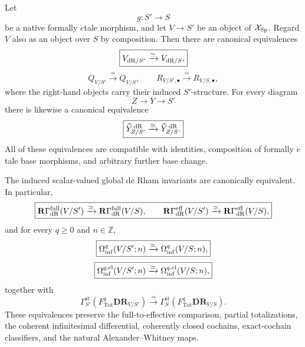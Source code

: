 \begin{theorem}
\label{thm:formal-etale-change-of-base-intrinsic}
Let
\[
    g:S'\longrightarrow S
\]
be a native formally \(\acute{e}\)tale morphism, and let \(V\to S'\) be an
object of \(\mathcal X_{\mathrm{Sp}}\).  Regard \(V\) also as an object over \(S\) by
composition.  Then there are canonical equivalences
\[
\boxed{
    V_{\mathrm{dR}/S'}
    \xrightarrow{\simeq}
    V_{\mathrm{dR}/S},
}
\]
\[
\boxed{
    Q_{V/S'}
    \xrightarrow{\simeq}
    Q_{V/S},
    \qquad
    R_{V/S',\bullet}
    \xrightarrow{\simeq}
    R_{V/S,\bullet},
}
\]
where the right-hand objects carry their induced \(S'\)-structure.  For every
diagram
\[
    Z\longrightarrow Y\longrightarrow S'
\]
there is likewise a canonical equivalence
\[
\boxed{
    \widehat Y^{\,\mathrm{dR}}_{Z/S'}
    \xrightarrow{\simeq}
    \widehat Y^{\,\mathrm{dR}}_{Z/S}.
}
\]
All of these equivalences are compatible with identities, composition of
formally \(\acute{e}\)tale base morphisms, and arbitrary further base change.

The induced scalar-valued global de Rham invariants are canonically
equivalent.  In particular,
\[
\boxed{
    \mathbf R\Gamma_{\mathrm{dR}}^{\mathrm{full}}(V/S')
    \xrightarrow{\simeq}
    \mathbf R\Gamma_{\mathrm{dR}}^{\mathrm{full}}(V/S),
    \qquad
    \mathbf R\Gamma_{\mathrm{dR}}^{\mathrm{eff}}(V/S')
    \xrightarrow{\simeq}
    \mathbf R\Gamma_{\mathrm{dR}}^{\mathrm{eff}}(V/S),
}
\]
and for every \(q\geq0\) and \(n\in\mathbb Z\),
\[
\boxed{
    \Omega_{\mathrm{inf}}^q(V/S';n)
    \xrightarrow{\simeq}
    \Omega_{\mathrm{inf}}^q(V/S;n),
}
\]
\[
\boxed{
    \Omega_{\mathrm{inf}}^{q,\mathrm{cl}}(V/S';n)
    \xrightarrow{\simeq}
    \Omega_{\mathrm{inf}}^{q,\mathrm{cl}}(V/S;n),
}
\]
together with
\[
\boxed{
    \Gamma_{S'}^{\mathrm{st}}
    \left(
        F_{\mathrm{Tot}}^q\mathbf{DR}_{V/S'}
    \right)
    \xrightarrow{\simeq}
    \Gamma_S^{\mathrm{st}}
    \left(
        F_{\mathrm{Tot}}^q\mathbf{DR}_{V/S}
    \right).
}
\]
These equivalences preserve the full-to-effective comparison, partial
totalizations, the coherent infinitesimal differential, coherently closed
cochains, exact-cochain classifiers, and the natural Alexander--Whitney maps.
\end{theorem}

